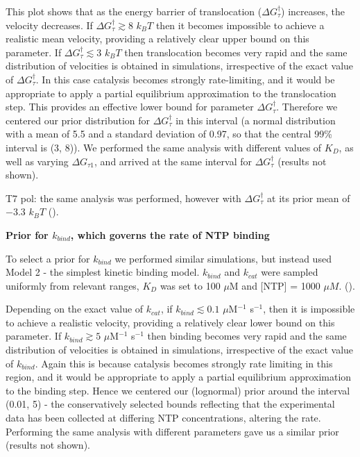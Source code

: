 \documentclass[10pt,letterpaper]{article}
\begin{document}
This plot shows that as the energy barrier of translocation ($\Delta G^\dag_{\tau}$) increases, the velocity decreases. If $\Delta G^\dag_{\tau} \gtrsim 8$ $k_BT$ then it becomes impossible to achieve a realistic mean velocity, providing a relatively clear upper bound on this parameter. If $\Delta G^\dag_{\tau} \lesssim 3$ $k_BT$ then translocation becomes very rapid and the same distribution of velocities is obtained in simulations, irrespective of the exact value of $\Delta G^\dag_{\tau}$. In this case catalysis becomes strongly rate-limiting, and it would be appropriate to apply a partial  equilibrium approximation to the translocation step. This provides an effective lower bound for parameter $\Delta G^\dag_{\tau}$. Therefore we centered our prior distribution for $\Delta G^\dag_{\tau}$ in this interval (a normal distribution with a mean of 5.5 and a standard deviation of 0.97, so that the central 99\% interval is (3, 8)).  We performed the same analysis with different values of $K_D$, as well as varying $\Delta G_{\tau 1}$, and arrived at the same interval for $\Delta G^\dag_{\tau}$ (results not shown). 


T7 pol: the same analysis was performed, however with $\Delta G^\dag_{\tau}$ at its prior mean of $-3.3$ $k_BT$ (). 



\textbf{Prior for $k_{bind}$, which governs the rate of NTP binding} \par



To select a prior for  $k_{bind}$ we performed similar simulations, but instead used Model 2 - the simplest kinetic binding model. $k_{bind}$ and $k_{cat}$ were sampled uniformly from relevant ranges, $K_D$ was set to 100 $\mu$M and [NTP] = 1000 $\mu M$. (). 


Depending on the exact value of $k_{cat}$, if $k_{bind} \lesssim 0.1$ $\mu$M$^{-1}$ s$^{-1}$, then it is impossible to achieve a realistic velocity, providing a relatively clear lower bound on this parameter. If $k_{bind} \gtrsim 5$ $\mu$M$^{-1}$ s$^{-1}$ then binding becomes very rapid and the same distribution of velocities is obtained in simulations, irrespective of the exact value of $k_{bind}$. Again this is because catalysis becomes strongly rate limiting in this region, and it would be appropriate to apply a partial  equilibrium approximation to the binding step. Hence we centered our (lognormal) prior around the interval (0.01, 5) - the conservatively selected bounds reflecting that the experimental data has been collected at differing NTP concentrations, altering the rate. Performing the same analysis with different parameters gave us a similar prior (results not shown).
\end{document}
